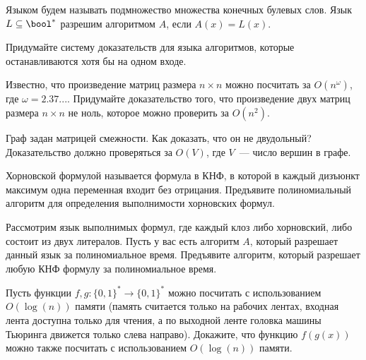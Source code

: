 
Языком будем называть подмножество множества конечных булевых слов. Язык $L \subseteq \bool^*$ разрешим алгоритмом $A$, если $A(x) = L(x)$.

\begin{task}
	Придумайте систему доказательств для языка алгоритмов, которые останавливаются
    хотя бы на одном входе.
\end{task}

\begin{task}
    Известно, что произведение матриц размера $n \times n$ можно посчитать за
    $O(n^{\omega})$, где $\omega =  2.37...$. Придумайте доказательство того, что 
    произведение двух матриц размера $n \times n$ не ноль, которое можно проверить за
    $O(n^2)$.
\end{task}

\begin{task}
    Граф задан матрицей смежности. Как доказать, что он не двудольный? Доказательство
    должно проверяться за $O(V)$, где $V$~--- число вершин в графе.
\end{task}

\begin{task}
    Хорновской формулой называется формула в КНФ, в которой в каждый дизъюнкт максимум одна переменная входит без
    отрицания. Предъявите полиномиальный алгоритм для определения выполнимости хорновских формул.
\end{task}

\begin{task}
	Рассмотрим язык выполнимых формул, где каждый клоз либо хорновский, либо состоит из двух литералов. Пусть у вас есть алгоритм
    $A$, который разрешает данный язык за полиномиальное время. Предъявите алгоритм, который разрешает любую КНФ формулу за
    полиномиальное время.
\end{task}

\begin{task}
    Пусть функции $f, g: \{0, 1\}^* \rightarrow \{0, 1\}^*$ можно посчитать с использованием $O(\log(n))$ памяти (память считается
    только на рабочих лентах, входная лента доступна только для чтения, а по выходной ленте головка машины Тьюринга движется
    только слева направо). Докажите, что функцию $f(g(x))$ можно также посчитать с использованием $O(\log(n))$ памяти.
\end{task}
